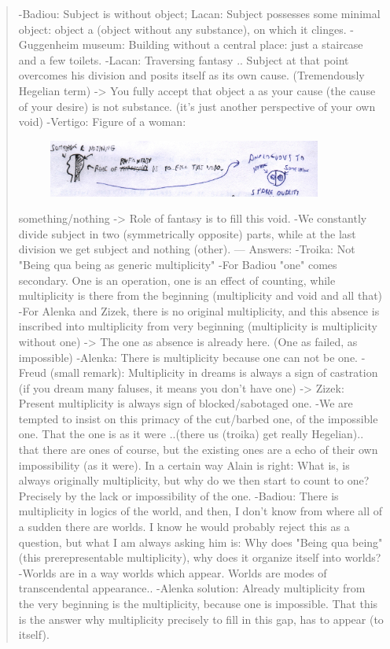 \documentclass[10pt]{book}
\begin{document}
\begin{quotation}
-Badiou: Subject is without object; Lacan: Subject possesses some minimal object: object a (object without any substance), on which it clinges.
-Guggenheim museum: Building without a central place: just a staircase and a few toilets.
-Lacan: Traversing fantasy .. Subject at that point overcomes his division and posits itself as its own cause. (Tremendously Hegelian term) -> You fully accept that object a as your cause (the cause of your desire) is not substance. (it's just another perspective of your own void)
-Vertigo: Figure of a woman:
\begin{figure}[ht!]
\centering
\includegraphics[width=90mm]{scan14.jpg}
\label{overflow}
\end{figure}
 something/nothing -> Role of fantasy is to fill this void.
-We constantly divide subject in two (symmetrically opposite) parts, while at the last division we get subject and nothing (other).
---
Answers:
-Troika: Not "Being qua being as generic multiplicity"
-For Badiou "one" comes secondary. One is an operation, one is an effect of counting, while multiplicity is there from the beginning (multiplicity and void and all that)
-For Alenka and Zizek, there is no original multiplicity, and this absence is inscribed into multiplicity from very beginning (multiplicity is multiplicity without one) -> The one as absence is already here. (One as failed, as impossible)
-Alenka: There is multiplicity because one can not be one.
-Freud (small remark): Multiplicity in dreams is always a sign of castration (if you dream many faluses, it means you don't have one) -> Zizek: Present multiplicity is always sign of blocked/sabotaged one.
-We are tempted to insist on this primacy of the cut/barbed one, of the impossible one. That the one is as it were ..(there us (troika) get really Hegelian).. that there are ones of course, but the existing ones are a echo of their own impossibility (as it were). In a certain way Alain is right: What is, is always originally multiplicity, but why do we then start to count to one? Precisely by the lack or impossibility of the one.
-Badiou: There is multiplicity in logics of the world, and then, I don't know from where all of a sudden there are worlds. I know he would probably reject this as a question, but what I am always asking him is: Why does "Being qua being" (this prerepresentable multiplicity), why does it organize itself into worlds? -Worlds are in a way worlds which appear. Worlds are modes of transcendental appearance.. -Alenka solution: Already multiplicity from the very beginning is the multiplicity, because one is impossible. That this is the answer why multiplicity precisely to fill in this gap, has to appear (to itself).

\end{quotation}
\end{document}
